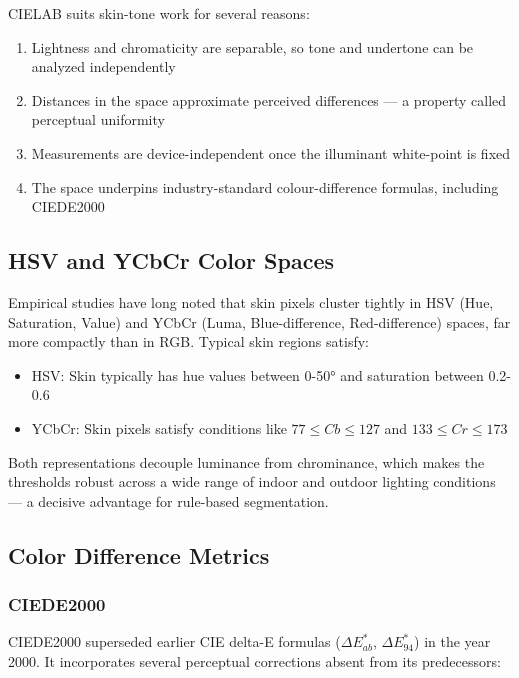 CIELAB suits skin-tone work for several reasons:
\begin{enumerate}
    \item Lightness and chromaticity are separable, so tone and undertone can be analyzed independently
    \item Distances in the space approximate perceived differences — a property called perceptual uniformity
    \item Measurements are device-independent once the illuminant white-point is fixed
    \item The space underpins industry-standard colour-difference formulas, including CIEDE2000
\end{enumerate}

\subsection{HSV and YCbCr Color Spaces}

Empirical studies have long noted that skin pixels cluster tightly in HSV (Hue, Saturation, Value) and YCbCr (Luma, Blue-difference, Red-difference) spaces, far more compactly than in RGB. Typical skin regions satisfy:

\begin{itemize}
    \item HSV: Skin typically has hue values between 0-50° and saturation between 0.2-0.6
    \item YCbCr: Skin pixels satisfy conditions like $77 \leq Cb \leq 127$ and $133 \leq Cr \leq 173$
\end{itemize}

Both representations decouple luminance from chrominance, which makes the thresholds robust across a wide range of indoor and outdoor lighting conditions — a decisive advantage for rule-based segmentation.

\subsection{Color Difference Metrics}

\subsubsection{CIEDE2000}

CIEDE2000 superseded earlier CIE delta-E formulas ($\Delta E^*_{ab}$, $\Delta E^*_{94}$) in the year 2000. It incorporates several perceptual corrections absent from its predecessors:


